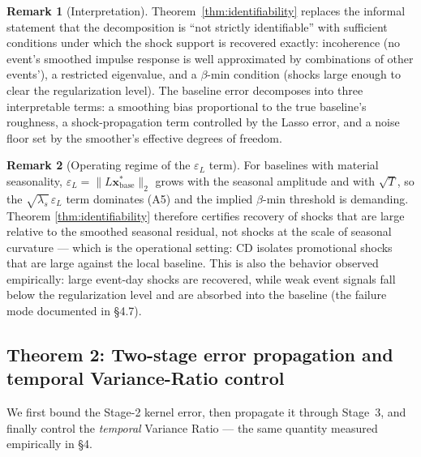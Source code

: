 \documentclass[10pt]{article} %
\theoremstyle{plain}
\theoremstyle{definition}
\newtheorem{remark}{Remark}
\begin{document}
\begin{remark}[Interpretation]
Theorem~\ref{thm:identifiability} replaces the informal statement that
the decomposition is ``not strictly identifiable'' with sufficient
conditions under which the shock support is recovered exactly:
incoherence (no event's smoothed impulse response is well approximated
by combinations of other events'), a restricted eigenvalue, and a
$\beta$-min condition (shocks large enough to clear the regularization
level). The baseline error decomposes into three interpretable terms:
a smoothing bias proportional to the true baseline's roughness, a
shock-propagation term controlled by the Lasso error, and a noise
floor set by the smoother's effective degrees of freedom.
\end{remark}

\begin{remark}[Operating regime of the $\varepsilon_{L}$ term]
For baselines with material seasonality,
$\varepsilon_{L}=\|L\mathbf{x}^{*}_{\mathrm{base}}\|_{2}$ grows with
the seasonal amplitude and with $\sqrt{T}$, so the
$\sqrt{\lambda_{s}}\,\varepsilon_{L}$ term dominates (A5) and the
implied $\beta$-min threshold is demanding. Theorem
\ref{thm:identifiability} therefore certifies recovery of shocks that
are large relative to the smoothed seasonal residual, not shocks at
the scale of seasonal curvature --- which is the operational setting:
CD isolates promotional shocks that are large against the local
baseline. This is also the behavior observed empirically: large
event-day shocks are recovered, while weak event signals fall below
the regularization level and are absorbed into the baseline (the
failure mode documented in \S 4.7).
\end{remark}

\subsection{Theorem 2: Two-stage error propagation and temporal
Variance-Ratio control}

We first bound the Stage-2 kernel error, then propagate it through
Stage~3, and finally control the \emph{temporal} Variance Ratio ---
the same quantity measured empirically in \S4.
\end{document}
